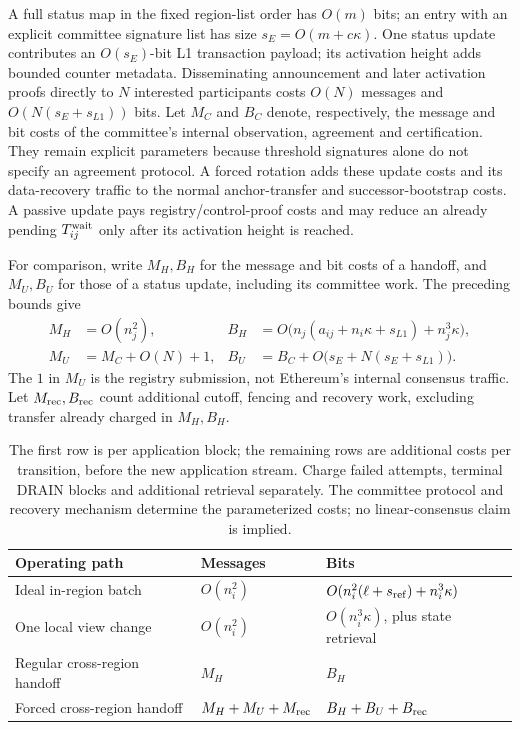 \documentclass[11pt,a4paper,onecolumn]{article}
\newcounter{protocol}
\begin{document}
A full status map in the fixed region-list order has $O(m)$ bits; an
entry with an explicit committee signature list has size
$s_E=O(m+c\kappa)$. One status update contributes an $O(s_E)$-bit L1
transaction payload; its activation height adds bounded counter metadata.
Disseminating announcement and later activation proofs directly to $N$
interested participants costs $O(N)$ messages and $O(N(s_E+s_{L1}))$ bits. Let $M_C$ and
$B_C$ denote, respectively, the message and bit costs of the committee's
internal observation, agreement and certification. They remain explicit
parameters because threshold
signatures alone do not specify an agreement protocol. A forced
rotation adds these update costs and its data-recovery traffic to the
normal anchor-transfer and successor-bootstrap costs. A passive update
pays registry/control-proof costs and may reduce an already pending
$T_{ij}^{\rm wait}$ only after its activation height is reached.

For comparison, write $M_H,B_H$ for the message and bit costs of a handoff,
and $M_U,B_U$ for those of a status update, including its committee work.
The preceding bounds give
\[
 \begin{aligned}
 M_H&=O(n_j^2),&
 B_H&=O\bigl(n_j(a_{ij}+n_i\kappa+s_{L1})+n_j^3\kappa\bigr),\\
 M_U&=M_C+O(N)+1,&
 B_U&=B_C+O\bigl(s_E+N(s_E+s_{L1})\bigr).
 \end{aligned}
\]
The $1$ in $M_U$ is the registry submission, not Ethereum's internal
consensus traffic. Let $M_{\rm rec},B_{\rm rec}$ count additional cutoff,
fencing and recovery work, excluding transfer already charged in $M_H,B_H$.

\begin{table}[htbp]\centering\small
\begin{tabularx}{\linewidth}{@{}p{.30\linewidth}p{.24\linewidth}Y@{}}
\toprule
Operating path & Messages & Bits\\\midrule
Ideal in-region batch & $O(n_i^2)$ & $O(n_i^2(\ell+s_{\rm ref})+n_i^3\kappa)$\\
One local view change & $O(n_i^2)$ & $O(n_i^3\kappa)$, plus state retrieval\\
Regular cross-region handoff & $M_H$ & $B_H$\\
Forced cross-region handoff & $M_H+M_U+M_{\rm rec}$ & $B_H+B_U+B_{\rm rec}$\\
\bottomrule
\end{tabularx}
\caption{The first row is per application block; the remaining rows are
additional costs per transition, before the new application stream. Charge
failed attempts, terminal DRAIN blocks and additional retrieval separately.
The committee protocol and recovery mechanism determine the parameterized
costs; no linear-consensus claim is implied.}
\label{tab:communication-paths}
\end{table}
\end{document}
